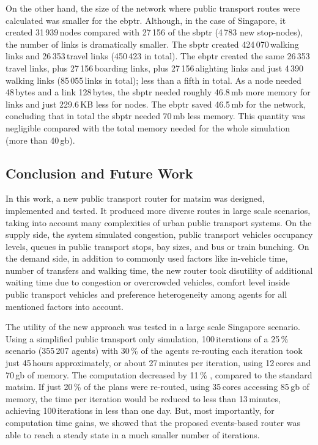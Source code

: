 On the other hand, the size of the network where public transport routes were calculated was smaller for the \gls{ebptr}. Although, in the case of Singapore, it created 31\,939\,nodes compared with 27\,156 of the \gls{sbptr} (4\,783 new stop-nodes), the number of links is dramatically smaller. The \gls{sbptr} created 424\,070\,walking links and 26\,353\,travel links (450\,423 in total). The \gls{ebptr} created the same 26\,353\,travel links, plus 27\,156\,boarding links, plus 27\,156\,alighting links and just 4\,390\,walking links (85\,055\,links in total); less than a fifth in total. As a node needed 48\,bytes and a link 128\,bytes, the \gls{sbptr} needed roughly 46.8\,\gls{mb} more memory for links and just 229.6\,KB less for nodes. The \gls{ebptr} saved 46.5\,\gls{mb} for the network, concluding that in total the \gls{sbptr} needed 70\,\gls{mb} less memory. This quantity was negligible compared with the total memory needed for the whole simulation (more than 40\,\gls{gb}).

\subsection{Conclusion and Future Work} 
\label{sec:ConclusionsAndOutlook}
In this work, a new public transport router for \gls{matsim} was designed, implemented and tested. It produced more diverse routes in large scale scenarios, taking into account many complexities of urban public transport systems. On the supply side, the system simulated congestion, public transport vehicles occupancy levels, queues in public transport stops, bay sizes, and bus or train bunching. On the demand side, in addition to commonly used factors like in-vehicle time, number of transfers and walking time, the new router took disutility of additional waiting time due to congestion or overcrowded vehicles, comfort level inside public transport vehicles and preference heterogeneity among agents for all mentioned factors into account.

The utility of the new approach was tested in a large scale Singapore scenario. Using a simplified public transport only simulation, 100\,iterations of a 25\,\% scenario (355\,207 agents) with 30\,\% of the agents re-routing each iteration took just 45\,hours approximately, or about 27\,minutes per iteration, using 12\,cores and 70\,\gls{gb} of memory. The computation decreased by 11\,\% , compared to the standard \gls{matsim}. If just 20\,\% of the plans were re-routed, using 35\,cores accessing 85\,\gls{gb} of memory, the time per iteration would be reduced to less than 13\,minutes, achieving 100\,iterations in less than one day. But, most importantly, for computation time gains, we showed that the proposed events-based router was able to reach a steady state in a much smaller number of iterations.

